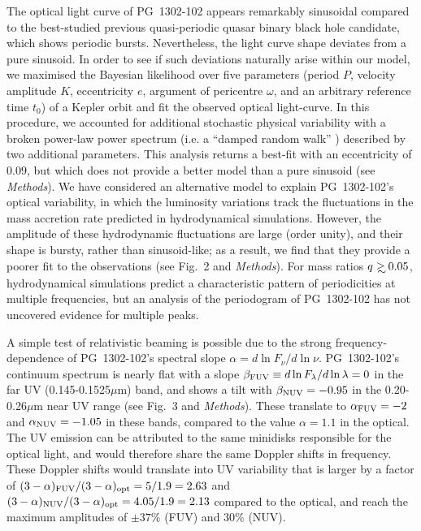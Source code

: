 The optical light curve of PG~1302-102 appears remarkably sinusoidal
compared to the best-studied previous quasi-periodic quasar binary
black hole candidate, which shows periodic bursts\cite{Valtonen+2008}.
Nevertheless, the light curve shape deviates from a pure sinusoid. In
order to see if such deviations naturally arise within our model, we
maximised the Bayesian likelihood over five parameters (period $P$,
velocity amplitude $K$, eccentricity $e$, argument of pericentre
$\omega$, and an arbitrary reference time $t_0$) of a Kepler
orbit\cite{WrightGaudi2012} and fit the observed optical light-curve.
In this procedure, we accounted for additional stochastic physical
variability with a broken power-law power spectrum (i.e. a ``damped
random walk'' \cite{Kelly:2009:DRW}) described by two additional
parameters.  This analysis returns a best-fit 
%
with an eccentricity of $0.09$, but which does not provide a better model than a pure sinusoid (see {\it Methods}).
%
We have considered an alternative model to explain PG~1302-102's
optical variability, in which the luminosity variations track the
fluctuations in the mass accretion rate predicted in hydrodynamical
simulations\cite{MM2008,ShiKrolik2012,Roedig+2012,Dorazio+2013,Farris+2014}.
However, the amplitude of these hydrodynamic fluctuations are large
(order unity), and their shape is bursty, rather than
sinusoid-like\cite{Dorazio+2013,Farris+2014,ShiKrolik2015}; as a
result, we find that they provide a poorer fit to the observations
(see Fig.~2 and {\it Methods}).  For mass ratios $q\gsim 0.05$,
hydrodynamical simulations predict a characteristic pattern of
periodicities at multiple frequencies, but an analysis of the
periodogram of PG~1302-102 has not uncovered evidence for multiple
peaks\cite{PG1302-Maria}.

A simple test of relativistic beaming is possible due to the strong
frequency-dependence of PG~1302-102's spectral slope $\alpha=d\ln
F_\nu /d\ln\nu$.  PG~1302-102's continuum spectrum is nearly flat with
a slope $\beta_{\rm FUV}\equiv d\ln F_\lambda /d\ln\lambda=0$ in the
far UV (0.145-0.1525$\mu$m) band, and shows a tilt with $\beta_{\rm
  NUV}=-0.95$ in the 0.20-0.26$\mu$m near UV range (see Fig.~3 and
{\it Methods}).  These translate to $\alpha_{\rm FUV}=-2$ and
$\alpha_{\rm NUV}=-1.05$ in these bands, compared to the value
$\alpha=1.1$ in the optical.  The UV emission can be attributed to the
same minidisks responsible for the optical light, and would therefore
share the same Doppler shifts in frequency. These Doppler shifts would
translate into UV variability that is larger by a factor of
$(3-\alpha)_{\rm FUV}/(3-\alpha)_{\rm opt}=5/1.9 = 2.63$ and
$(3-\alpha)_{\rm NUV}/(3-\alpha)_{\rm opt}=4.05/1.9 = 2.13$ compared
to the optical, and reach the maximum amplitudes of $\pm 37\%$ (FUV)
and 30\% (NUV).

